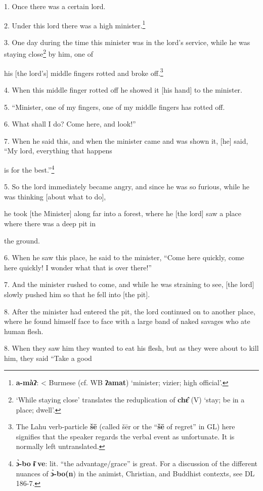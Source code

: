 \setcounter{footnote}{0}

1. Once there was a certain lord.

2. Under this lord there was a high minister.\footnote{\textbf{a-màʔ}: < Burmese (cf. WB \textbf{ʔamat}) `minister; vizier; high official'.}

3. One day during the time this minister was in the lord's service, while he was
staying close\footnote{`While staying close' translates the reduplication of \textbf{chɛ̂} (V) `stay; be in a place; dwell'.} by him, one of

his [the lord's] middle fingers rotted and broke off.\footnote{The Lahu verb-particle \textbf{šē} (called šēr or the ``\textbf{šē} of regret'' in GL) here signifies that the speaker regards the verbal event as unfortunate. It is normally left untranslated.}

4. When this middle finger rotted off he showed it [his hand] to the minister.

5. ``Minister, one of my fingers, one of my middle fingers has rotted off.

6. What shall I do? Come here, and look!''

7. When he said this, and when the minister came and was shown it, [he] said, ``My
lord, everything that happens

is for the best.''\footnote{\textbf{ɔ̀-bo} \textbf{ɨ̄} \textbf{ve}: lit. ``the advantage/grace'' is great. For a discussion of the different nuances of \textbf{ɔ̀-bo(n}) in the animist, Christian, and Buddhist contexts, see DL 186-7.}

5. So the lord immediately became angry, and since he was so furious, while he
was thinking [about what to do],

he took [the Minister] along far into a forest, where he [the lord] saw a place
where there was a deep pit in

the ground.

6. When he saw this place, he said to the minister, ``Come here quickly, come here
quickly! I wonder what that is over there!''

7. And the minister rushed to come, and while he was straining to see, [the lord]
slowly pushed him so that he fell into [the pit].

8. After the minister had entered the pit, the lord continued on to another place,
where he found himself face to face with a large band of naked savages who ate
human flesh.

8. When they saw him they wanted to eat his flesh, but as they were about to kill
him, they said ``Take a good

